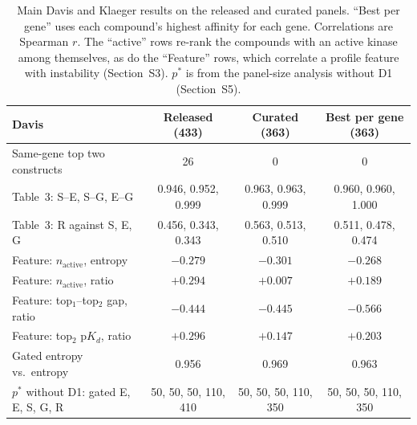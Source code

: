 \documentclass[11pt]{article}
\begin{document}
\begin{table}[h]
\centering
\caption{Main Davis and Klaeger results on the released and curated panels.
``Best per gene'' uses each compound's highest affinity for each gene.
Correlations are Spearman $r$. The ``active'' rows re-rank the compounds with an
active kinase among themselves, as do the ``Feature'' rows, which
correlate a profile feature with instability (Section~S3). $p^*$ is from the
panel-size analysis without D1 (Section~S5).}
\footnotesize
\begin{tabular}{lccc}
\toprule
Davis & Released (433) & Curated (363) & Best per gene (363) \\
\midrule
Same-gene top two constructs & 26 & 0 & 0 \\
Table~3: S--E, S--G, E--G & 0.946, 0.952, 0.999 & 0.963, 0.963, 0.999 & 0.960, 0.960, 1.000 \\
Table~3: R against S, E, G & 0.456, 0.343, 0.343 & 0.563, 0.513, 0.510 & 0.511, 0.478, 0.474 \\
Feature: $n_\mathrm{active}$, entropy & $-0.279$ & $-0.301$ & $-0.268$ \\
Feature: $n_\mathrm{active}$, ratio & $+0.294$ & $+0.007$ & $+0.189$ \\
Feature: top$_1$--top$_2$ gap, ratio & $-0.444$ & $-0.445$ & $-0.566$ \\
Feature: top$_2$ $\mathrm{p}K_d$, ratio & $+0.296$ & $+0.147$ & $+0.203$ \\
Gated entropy vs.\ entropy & 0.956 & 0.969 & 0.963 \\
$p^*$ without D1: gated E, E, S, G, R & 50, 50, 50, 110, 410 & 50, 50, 50, 110, 350 & 50, 50, 50, 110, 350 \\
\bottomrule
\end{tabular}


\end{table}
\end{document}
